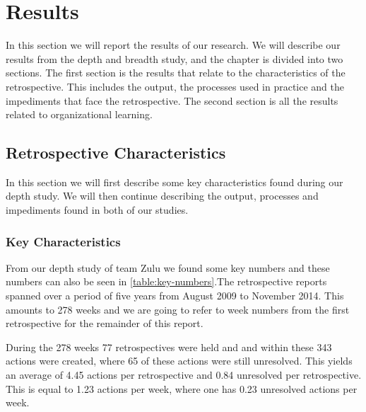 \chapter{Results}
In this section we will report the results of our research. We will describe our results from the depth and breadth study, and the chapter is divided into two sections. The first section is the results that relate to the characteristics of the retrospective. This includes the output, the processes used in practice and the impediments that face the retrospective. The second section is all the results related to organizational learning.

\section{Retrospective Characteristics}
In this section we will first describe some key characteristics found during our depth study. We will then continue describing the output, processes and impediments found in both of our studies. 

\subsection{Key Characteristics}
From our depth study of team Zulu we found some key numbers and these numbers can also be seen in \autoref{table:key-numbers}.The retrospective reports spanned over a period of five years from August 2009 to November 2014. This amounts to 278 weeks and we are going to refer to week numbers from the first retrospective for the remainder of this report. 
\begin{table}[!h]
	\begin{center}
	\caption{Some key numbers from the retrospectives}
	\label{table:key-numbers}
\end{center}
\end{table}
During the 278 weeks 77 retrospectives were held and and within these 343 actions were created, where 65 of these actions were still unresolved. This yields an average of 4.45 actions per retrospective and 0.84 unresolved per retrospective. This is equal to 1.23 actions per week, where one has 0.23 unresolved actions per week. 

